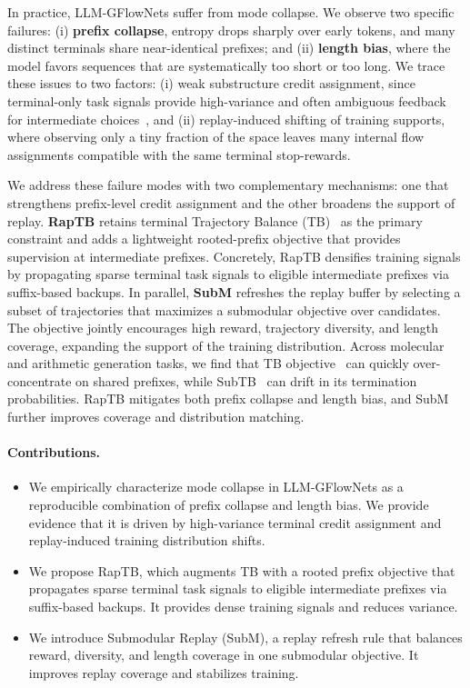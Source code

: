 \documentclass{article}
\theoremstyle{plain}
\theoremstyle{definition}
\theoremstyle{remark}
\begin{document}
In practice, LLM-GFlowNets suffer from mode collapse. We observe two specific failures: (i) \textbf{prefix collapse}, entropy drops sharply over early tokens, and many distinct terminals share near-identical prefixes; and (ii) \textbf{length bias}, where the model favors sequences that are systematically too short or too long. We trace these issues to two factors: (i) weak substructure credit assignment, since terminal-only task signals provide high-variance and often ambiguous feedback for intermediate choices~\citep{madan2023learning},
and (ii) replay-induced shifting of training supports, where observing only a tiny fraction of the space leaves many internal flow assignments compatible with the same terminal stop-rewards.

We address these failure modes with two complementary mechanisms: one that strengthens prefix-level credit assignment and the other broadens the support of replay.
\textbf{RapTB} retains terminal Trajectory Balance (TB)~\citep{malkin2022trajectory} as the primary constraint and adds a lightweight rooted-prefix objective that provides supervision at intermediate prefixes.
Concretely, RapTB densifies training signals by propagating sparse terminal task signals to eligible intermediate prefixes via suffix-based backups.
In parallel, \textbf{SubM} refreshes the replay buffer by selecting a subset of trajectories that maximizes a submodular objective over candidates. The objective jointly encourages high reward, trajectory diversity, and length coverage, expanding the support of the training distribution. Across molecular and arithmetic generation tasks, we find that TB objective~\citep{malkin2022trajectory} can quickly over-concentrate on shared prefixes, while SubTB~\citep{hu2024amortizing} can drift in its termination probabilities. RapTB mitigates both prefix collapse and length bias, and SubM further improves coverage and distribution matching.

\paragraph{Contributions.}
\begin{itemize}
    \vspace{-0.8em}
    \item We empirically characterize mode collapse in LLM-GFlowNets as a reproducible combination of prefix collapse and length bias.
    We provide evidence that it is driven by high-variance terminal credit assignment and replay-induced training distribution shifts.
    \item We propose RapTB, which augments TB with a rooted prefix objective that propagates sparse terminal task signals to eligible intermediate prefixes via suffix-based backups.
    It provides dense training signals and reduces variance.
    \item We introduce Submodular Replay (SubM), a replay refresh rule that balances reward, diversity, and length coverage in one submodular objective.
    It improves replay coverage and stabilizes training.
\end{itemize}
\end{document}
